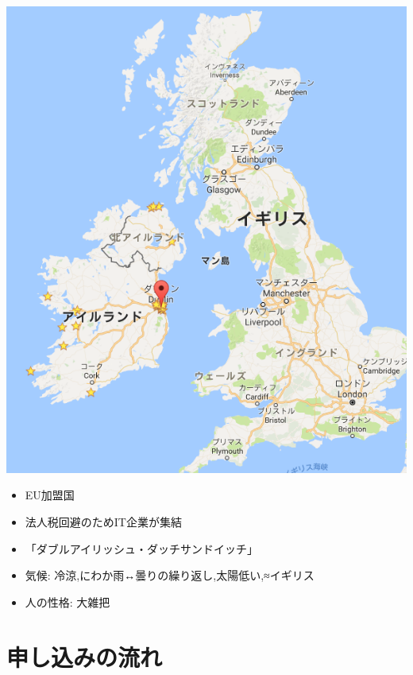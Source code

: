 \begin{container-fluid}
\begin{row-fluid}
\begin{span6}
\includegraphics{img/static/ireland.png}
\end{span6}
\begin{span6}
\begin{itemize}
\item EU加盟国
\item 法人税回避のためIT企業が集結
\item 「ダブルアイリッシュ・ダッチサンドイッチ」
\item 気候: 冷涼,にわか雨↔曇りの繰り返し,太陽低い,≈イギリス
\item 人の性格: 大雑把
\end{itemize}
\end{span6}
\end{row-fluid}
\end{container-fluid}

\section{申し込みの流れ}
\label{sec-3}

